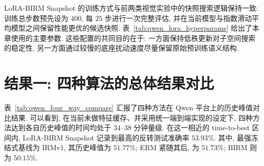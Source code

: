 \documentclass[a4paper,punct=banjiao,twoside]{ctexrep}
\theoremstyle{plain}
\theoremstyle{definition}
\theoremstyle{remark}
\begin{document}
LoRA-BIRM Snapshot 的训练方式与前两类视觉实验中的快照搜索逻辑保持一致: 训练总步数预先设为 $400$, 每 $25$ 步进行一次完整评估, 并在当前模型与指数滑动平均模型之间保留性能更优的候选快照. 表~\ref{tab:qwen_lora_hyperparams} 给出了本章使用的主要参数. 这些配置的共同目的在于: 一方面保持低秩更新对子空间搜索的稳定性, 另一方面通过较慢的底座扰动速度尽量保留原始预训练语义结构.

\begin{table}[htbp]
    \centering
    \caption{Qwen 平台上 LoRA-BIRM Snapshot 的主要超参数.}
    \label{tab:qwen_lora_hyperparams}
    \vspace{0.6em}

\end{table}

\section{结果一: 四种算法的总体结果对比}

表~\ref{tab:qwen_four_way_compare} 汇报了四种方法在 Qwen 平台上的历史峰值对比结果. 可以看到, 在当前未做特征缓存、并采用统一端到端实现的设定下, 四种方法达到各自历史峰值的时间均处于 $34$--$38$ 分钟量级. 在这一相近的 time-to-best 区间内, LoRA-BIRM Snapshot 记录到最高的反转测试准确率 $53.93\%$. 其中, 最强冻结式基线为 IRMv1, 其历史峰值为 $51.77\%$; ERM 紧随其后, 为 $51.73\%$; BIRM 则为 $50.15\%$.
\end{document}
